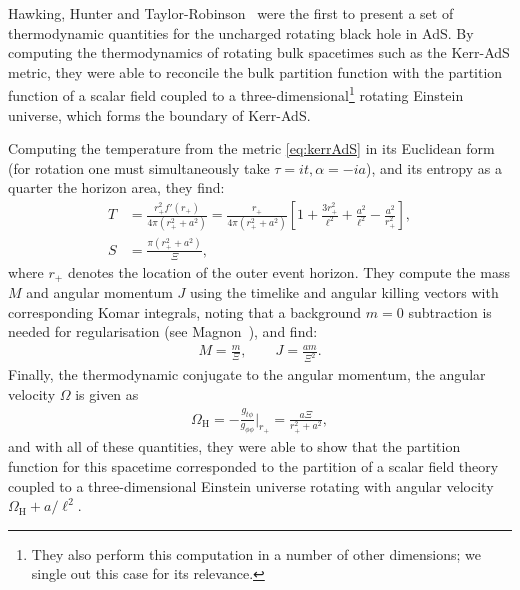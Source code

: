\documentclass[
twoside,
openright,
frontopenright
]{dmathesis}
\newcommand{\nn}{\nonumber}
\begin{document}
Hawking, Hunter and Taylor-Robinson~\cite{Hawking:1998kw} were the first to
present a set of thermodynamic quantities for the uncharged rotating black hole
in AdS. By computing the thermodynamics of rotating bulk spacetimes such as the
Kerr-AdS metric, they were able to reconcile the bulk partition function with
the partition function of a scalar field coupled to a
three-dimensional\footnote{They also perform this computation in a number of
  other dimensions; we single out this case for its relevance.} rotating
Einstein universe, which forms the boundary of Kerr-AdS. 

Computing the temperature from the metric \cref{eq:kerrAdS} in its Euclidean
form (for rotation one must simultaneously take $\tau=it, \alpha=-ia$), and its
entropy as a quarter the horizon area, they find:
\begin{align}
  \label{eq:kerrAdSTS}
  T&=\frac{r_+^2f'(r_+)}{4\pi(r_+^2+a^2)} = \frac{r_+}{4\pi(r_+^2+a^2)} \left[1 +
  \frac{3r_+^2}{\ell^2} + \frac{a^2}{\ell^2} - \frac{a^2}{r_+^2}\right],\nn\\
  S&=\frac{\pi(r_+^2+a^2)}{\Xi},
\end{align}
where $r_+$ denotes the location of the outer event horizon. They compute the
mass $M$ and angular momentum $J$ using the timelike and angular killing vectors
with corresponding Komar integrals, noting that a background $m=0$ subtraction
is needed for regularisation (see Magnon~\cite{Magnon:1985sc}), and find:
\begin{align}
  \label{eq:kerrAdSMJ-HTT}
  M=\frac{m}{\Xi}, \qquad J=\frac{am}{\Xi^2}.
\end{align}
Finally, the thermodynamic conjugate to the angular momentum, the angular
velocity $\Omega$ is given as
\begin{align}
  \label{eq:kerrAdSO-HTT}
  \Omega_\mathrm{H} = -\frac{g_{t\phi}}{g_{\phi\phi}}\Big|_{r_+} = \frac{a\Xi}{r_+^2+a^2},
\end{align}
and with all of these quantities, they were able to show that the partition
function for this spacetime corresponded to the partition of a scalar field
theory coupled to a three-dimensional Einstein universe rotating with angular
velocity $\Omega_\mathrm{H} + a/\ell^2$.
\end{document}
